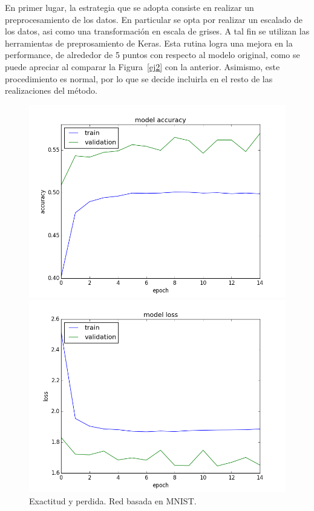 \documentclass{article}[12pt, a4paper]
\begin{document}
En primer lugar, la estrategia que se adopta consiste en realizar  un preprocesamiento de los datos. 
En particular se opta por realizar un escalado de los datos, asi como una transformaci\'on en escala
de grises. A tal fin se utilizan las herramientas de preprosamiento de Keras. Esta rutina logra una mejora
en la performance, de alrededor de 5 puntos con respecto al modelo original, como se puede apreciar
al comparar la Figura~\ref{ej2} con la anterior. Asimismo, este procedimiento es normal, por lo que se
decide incluirla en el resto de las realizaciones del m\'etodo.
\begin{figure}[h!]
	\begin{minipage}[h]{0.49\textwidth}
		\includegraphics[width=\textwidth]{ej1acc}
	\end{minipage}
	\begin{minipage}[h]{0.49\textwidth}
		\includegraphics[width=\textwidth]{ej1loss}
	\end{minipage}
	\caption{Exactitud y perdida. Red basada en MNIST.}
	\label{ej1}
\end{figure}
\end{document}
